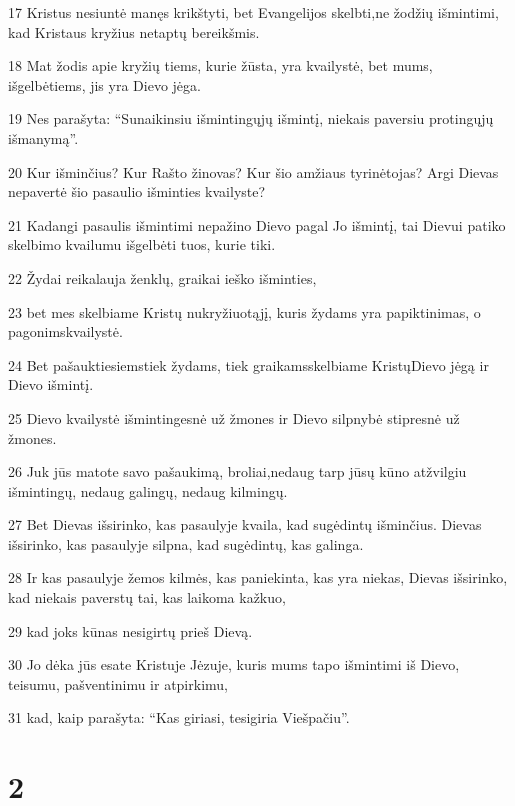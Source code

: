 \par 17 Kristus nesiuntė manęs krikštyti, bet Evangelijos skelbti,­ne žodžių išmintimi, kad Kristaus kryžius netaptų bereikšmis. 
\par 18 Mat žodis apie kryžių tiems, kurie žūsta, yra kvailystė, bet mums, išgelbėtiems, jis yra Dievo jėga. 
\par 19 Nes parašyta: “Sunaikinsiu išmintingųjų išmintį, niekais paversiu protingųjų išmanymą”. 
\par 20 Kur išminčius? Kur Rašto žinovas? Kur šio amžiaus tyrinėtojas? Argi Dievas nepavertė šio pasaulio išminties kvailyste? 
\par 21 Kadangi pasaulis išmintimi nepažino Dievo pagal Jo išmintį, tai Dievui patiko skelbimo kvailumu išgelbėti tuos, kurie tiki. 
\par 22 Žydai reikalauja ženklų, graikai ieško išminties, 
\par 23 bet mes skelbiame Kristų nukryžiuotąjį, kuris žydams yra papiktinimas, o pagonims­kvailystė. 
\par 24 Bet pašauktiesiems­tiek žydams, tiek graikams­skelbiame Kristų­Dievo jėgą ir Dievo išmintį. 
\par 25 Dievo kvailystė išmintingesnė už žmones ir Dievo silpnybė stipresnė už žmones. 
\par 26 Juk jūs matote savo pašaukimą, broliai,­nedaug tarp jūsų kūno atžvilgiu išmintingų, nedaug galingų, nedaug kilmingų. 
\par 27 Bet Dievas išsirinko, kas pasaulyje kvaila, kad sugėdintų išminčius. Dievas išsirinko, kas pasaulyje silpna, kad sugėdintų, kas galinga. 
\par 28 Ir kas pasaulyje žemos kilmės, kas paniekinta, kas yra niekas, Dievas išsirinko, kad niekais paverstų tai, kas laikoma kažkuo,­ 
\par 29 kad joks kūnas nesigirtų prieš Dievą. 
\par 30 Jo dėka jūs esate Kristuje Jėzuje, kuris mums tapo išmintimi iš Dievo, teisumu, pašventinimu ir atpirkimu, 
\par 31 kad, kaip parašyta: “Kas giriasi, tesigiria Viešpačiu”.


\chapter{2}


